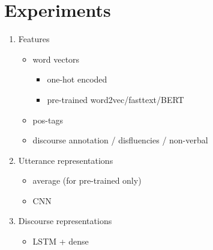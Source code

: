 \documentclass[11pt,a4paper]{article}
\begin{document}
\section{Experiments}
\begin{enumerate}
\item Features
  \begin{itemize}
  \item word vectors
    \begin{itemize}
    \item one-hot encoded
    \item pre-trained word2vec/fasttext/BERT
    \end{itemize}
  \item pos-tags
  \item discourse annotation / disfluencies / non-verbal
  \end{itemize}
\item Utterance representations
  \begin{itemize}
  \item average (for pre-trained only)
  \item CNN
  \end{itemize}
\item Discourse representations
  \begin{itemize}
  \item LSTM + dense
  \end{itemize}
\end{enumerate}


{}

\end{document}
